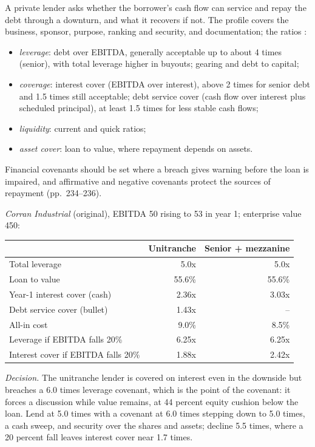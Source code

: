 \begin{qfmethod}\label{meth:private-debt-credit-analysis}
 A private lender asks whether the borrower's cash flow can service and repay the debt through a downturn, and what it recovers if not. The profile covers the business, sponsor, purpose, ranking and security, and documentation; the ratios \citep[pp.~236--238]{ippolito-private-capital-2020}:
\begin{itemize}
\item \emph{leverage}: debt over EBITDA, generally acceptable up to about 4 times (senior), with total leverage higher in buyouts; gearing and debt to capital;
\item \emph{coverage}: interest cover (EBITDA over interest), above 2 times for senior debt and 1.5 times still acceptable; debt service cover (cash flow over interest plus scheduled principal), at least 1.5 times for less stable cash flows;
\item \emph{liquidity}: current and quick ratios;
\item \emph{asset cover}: loan to value, where repayment depends on assets.
\end{itemize}
Financial covenants should be set where a breach gives warning before the loan is impaired, and affirmative and negative covenants protect the sources of repayment (pp.~234--236).

 \emph{Corran Industrial} (original), EBITDA 50 rising to 53 in year 1; enterprise value 450:
\begin{center}\small
\begin{tabular}{@{}lrr@{}}
\toprule
 & Unitranche & Senior + mezzanine \\
\midrule
Total leverage & 5.0x & 5.0x \\
Loan to value & 55.6\% & 55.6\% \\
Year-1 interest cover (cash) & 2.36x & 3.03x \\
Debt service cover (bullet) & 1.43x & -- \\
All-in cost & 9.0\% & 8.5\% \\
Leverage if EBITDA falls 20\% & 6.25x & 6.25x \\
Interest cover if EBITDA falls 20\% & 1.88x & 2.42x \\
\bottomrule
\end{tabular}
\end{center}
\emph{Decision.} The unitranche lender is covered on interest even in the downside but breaches a 6.0 times leverage covenant, which is the point of the covenant: it forces a discussion while value remains, at 44 percent equity cushion below the loan. Lend at 5.0 times with a covenant at 6.0 times stepping down to 5.0 times, a cash sweep, and security over the shares and assets; decline 5.5 times, where a 20 percent fall leaves interest cover near 1.7 times.


\end{qfmethod}

